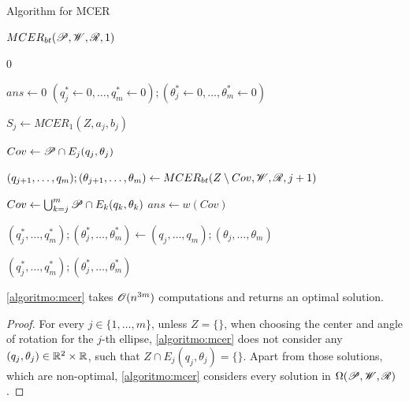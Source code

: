\begin{algoritmo}
	\caption{Algorithm for MCER}\label{algoritmo:mcer}
	\begin{algorithmic}[1]
		
		
		\item[]
		\State \Return $MCER_{bt}(\mathscr{P}, \mathscr{W}, \mathscr{R}, 1)$
		\EndProcedure
		
		\item[]
		
		\State \Return $0$
		\EndIf
		
		\State $ans \gets 0$
		\State $(q_{j}^*\gets 0, \dots, q_m^*\gets0); (\theta_{j}^*\gets 0, \dots, \theta_m^*\gets 0)$ 
		
		\State $S_j \gets MCER_1(Z, a_j, b_j)$

		
		\State $Cov \gets \mathscr{P} \cap E_j(q_j, \theta_j)$
		
		\State $(q_{j+1}, \dots, q_m); (\theta_{j+1}, \dots, \theta_m) \gets  MCER_{bt}(Z\setminus Cov, \mathscr{W}, \mathscr{R}, j+1)$
		
		
		\State $Cov \gets \bigcup_{k=j}^m \mathscr{P} \cap E_k(q_k, \theta_k)$
			\State $ans \gets w(Cov)$
			
			\State $(q_{j}^*, \dots, q_m^*); (\theta_{j}^*, \dots, \theta_m^*) \gets (q_{j}, \dots, q_m); (\theta_{j}, \dots, \theta_m)$
		\EndIf
		\EndFor
		
		\State \Return $(q_{j}^*, \dots, q_m^*); (\theta_{j}^*, \dots, \theta_m^*)$
		\EndProcedure
	\end{algorithmic}
\end{algoritmo}

\begin{corolario}
	\autoref{algoritmo:mcer} takes $\mathscr{O}(n^{3m})$ computations and returns an optimal solution.
\end{corolario}

\begin{proof}
	For every $j\in\{1, \dots, m\}$, unless $Z=\{\}$, when choosing the center and angle of rotation for the $j$-th ellipse, \autoref{algoritmo:mcer} does not consider any $(q_j, \theta_j) \in \mathbb{R}^2 \times \mathbb{R}$, such that $Z \cap E_j(q_j, \theta_j) = \{\}$. Apart from those solutions, which are non-optimal, \autoref{algoritmo:mcer} considers every solution in $\Omega(\mathscr{P}, \mathscr{W}, \mathscr{R})$.
\end{proof}

